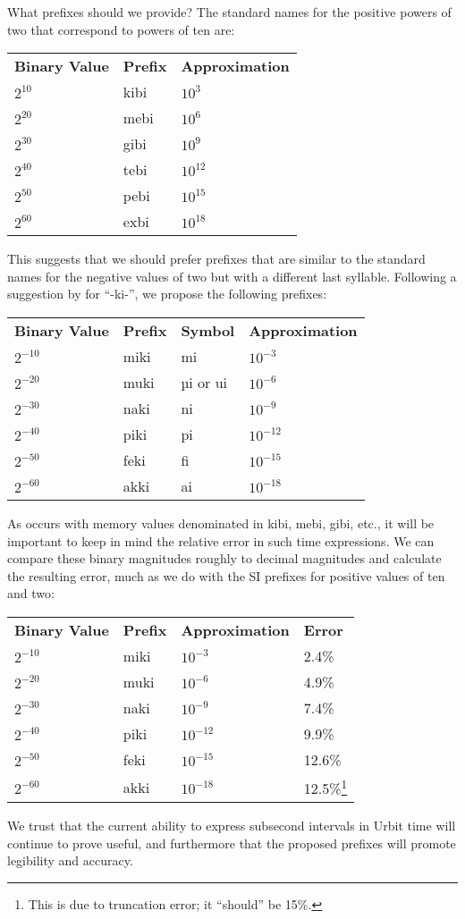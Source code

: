 \documentclass[twoside]{article}
\begin{document}
\noindent
What prefixes should we provide?  The standard names for the positive powers of two that correspond to powers of ten are:

\begin{tabularx}{\textwidth}{lll}
  \textbf{Binary Value} & \textbf{Prefix} & \textbf{Approximation} \\
  $2^{10}$ & kibi & $10^{3}$ \\
  $2^{20}$ & mebi & $10^{6}$ \\
  $2^{30}$ & gibi & $10^{9}$ \\
  $2^{40}$ & tebi & $10^{12}$ \\
  $2^{50}$ & pebi & $10^{15}$ \\
  $2^{60}$ & exbi & $10^{18}$ \\
\end{tabularx}

This suggests that we should prefer prefixes that are similar to the standard names for the negative values of two but with a different last syllable.  Following a suggestion by  for “-ki-”, we propose the following prefixes:

\begin{tabularx}{\textwidth}{llll}
  \textbf{Binary Value} & \textbf{Prefix} & \textbf{Symbol} & \textbf{Approximation} \\
  $2^{-10}$ & miki & mi & $10^{-3}$ \\
  $2^{-20}$ & muki & µi or ui & $10^{-6}$ \\
  $2^{-30}$ & naki & ni & $10^{-9}$ \\
  $2^{-40}$ & piki & pi & $10^{-12}$ \\
  $2^{-50}$ & feki & fi & $10^{-15}$ \\
  $2^{-60}$ & akki & ai & $10^{-18}$ \\
\end{tabularx}

As occurs with memory values denominated in kibi, mebi, gibi, etc., it will be important to keep in mind the relative error in such time expressions.  We can compare these binary magnitudes roughly to decimal magnitudes and calculate the resulting error, much as we do with the SI prefixes for positive values of ten and two:

\begin{tabularx}{\textwidth}{llll}
  \textbf{Binary Value} & \textbf{Prefix} & \textbf{Approximation} & \textbf{Error} \\
  $2^{-10}$ & miki & $10^{-3}$ & 2.4\% \\
  $2^{-20}$ & muki & $10^{-6}$ & 4.9\% \\
  $2^{-30}$ & naki & $10^{-9}$ & 7.4\% \\
  $2^{-40}$ & piki & $10^{-12}$ & 9.9\% \\
  $2^{-50}$ & feki & $10^{-15}$ & 12.6\% \\
  $2^{-60}$ & akki & $10^{-18}$ & 12.5\%\footnote{This is due to truncation error; it ``should'' be 15\%.} \\
\end{tabularx}

We trust that the current ability to express subsecond intervals in Urbit time will continue to prove useful, and furthermore that the proposed prefixes will promote legibility and accuracy. \tombstone{}

\printbibliography
\afterpage{\blankpage}
\end{document}
